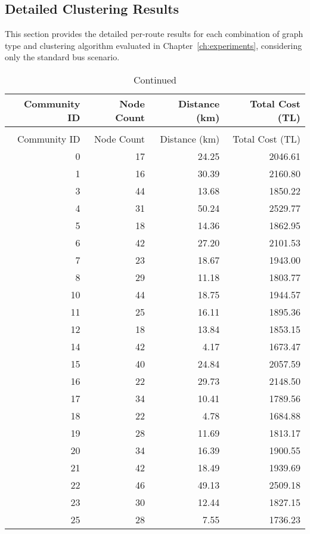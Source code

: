 \begin{appendix}
\section{Detailed Clustering Results}
\label{sec:appendix_detailed_results}

This section provides the detailed per-route results for each combination of graph type and clustering algorithm evaluated in Chapter~\ref{ch:experiments}, considering only the standard bus scenario.

\begin{longtable}{rrrr}
\caption{Detailed Results for Leiden Clustering on Complete Graph (Only Buses)}
\label{tab:appendix_leiden_complete} \\
\toprule
Community ID & Node Count & Distance (km) & Total Cost (TL) \\
\midrule
\endfirsthead
\caption[]{Continued} \\
\toprule
Community ID & Node Count & Distance (km) & Total Cost (TL) \\
\midrule
\endhead
0 & 17 & 24.25 & 2046.61 \\
1 & 16 & 30.39 & 2160.80 \\
3 & 44 & 13.68 & 1850.22 \\
4 & 31 & 50.24 & 2529.77 \\
5 & 18 & 14.36 & 1862.95 \\
6 & 42 & 27.20 & 2101.53 \\
7 & 23 & 18.67 & 1943.00 \\
8 & 29 & 11.18 & 1803.77 \\
10 & 44 & 18.75 & 1944.57 \\
11 & 25 & 16.11 & 1895.36 \\
12 & 18 & 13.84 & 1853.15 \\
14 & 42 & 4.17 & 1673.47 \\
15 & 40 & 24.84 & 2057.59 \\
16 & 22 & 29.73 & 2148.50 \\
17 & 34 & 10.41 & 1789.56 \\
18 & 22 & 4.78 & 1684.88 \\
19 & 28 & 11.69 & 1813.17 \\
20 & 34 & 16.39 & 1900.55 \\
21 & 42 & 18.49 & 1939.69 \\
22 & 46 & 49.13 & 2509.18 \\
23 & 30 & 12.44 & 1827.15 \\
25 & 28 & 7.55 & 1736.23 \\

\end{longtable}
\end{appendix}

